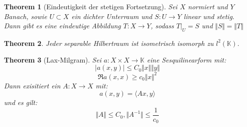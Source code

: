 \documentclass[10pt,a4paper]{article}
\newtheorem{theorem}{Theorem}
\begin{document}
\begin{theorem}[Eindeutigkeit der stetigen Fortsetzung]
	Sei $X$ normiert und $Y$ Banach, sowie $U\subset X$ ein dichter Unterraum und $S:  U\to Y$ linear und stetig. Dann gibt es eine eindeutige Abbildung $T: X \to Y$, sodass $T|_U = S$ und $\Vert S\Vert =\Vert T\Vert$
\end{theorem}
\begin{theorem}
	Jeder separable Hilbertraum ist isometrisch isomorph zu $l^2(\mathbb{K})$.
\end{theorem}
\begin{theorem}[Lax-Milgram]
	Sei $a: X \times X \to \mathbb{K}$ eine Sesquilinearform mit:
	$$|a(x, y)|\leq C_0 \Vert x\Vert \Vert y\Vert$$
	$$\Re a(x, x) \geq c_0\Vert x\Vert^2$$
	Dann exisitiert ein $A: X\to X$ mit:
	$$a(x, y) = \langle Ax, y\rangle$$
	und es gilt:
	$$\Vert A\Vert \leq C_0, \Vert A^{-1}\Vert \leq \frac{1}{c_0}$$
\end{theorem}
\end{document}
